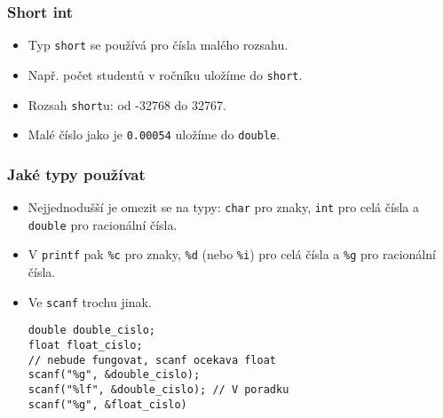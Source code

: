 \documentclass{beamer}
\newenvironment{itemizex}%
  {\large \begin{itemize}%
    \setlength{\itemsep}{8pt}%
    \setlength{\parskip}{8pt}}%
  {\end{itemize}}
\begin{document}
\begin{frame}[t,fragile]\frametitle{Short int} 
  \begin{itemizex}
    \item Typ \texttt{short} se používá pro čísla malého rozsahu.
    \item Např. počet studentů v ročníku uložíme do \texttt{short}.
    \item Rozsah \texttt{short}u: od -32768 do 32767.
    \item Malé číslo jako je \texttt{0.00054} uložíme do \texttt{double}.
  \end{itemizex}
\end{frame}



\begin{frame}[t,fragile]\frametitle{Jaké typy používat} 
  \begin{itemize}
    \item Nejjednodušší je omezit se na typy: \texttt{char} pro znaky, \texttt{int} pro celá čísla a \texttt{double} pro racionální čísla.
    \item V \texttt{printf} pak \texttt{\%c} pro znaky, \texttt{\%d} (nebo \texttt{\%i}) pro celá čísla a \texttt{\%g} pro racionální čísla.
    \item Ve \texttt{scanf} trochu jinak. 
\begin{verbatim} 
double double_cislo;
float float_cislo;
// nebude fungovat, scanf ocekava float
scanf("%g", &double_cislo); 
scanf("%lf", &double_cislo); // V poradku
scanf("%g", &float_cislo)
\end{verbatim}
  \end{itemize}
\end{frame}
\end{document}

